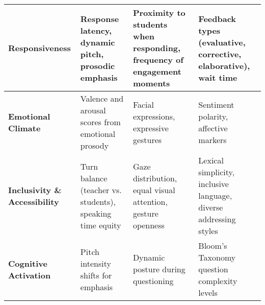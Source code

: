 \begin{table*}[htbp]
\begin{tabularx}{\textwidth}{|>{\raggedright\arraybackslash}X|>{\raggedright\arraybackslash}X|>{\raggedright\arraybackslash}X|>{\raggedright\arraybackslash}X|}
	\textbf{Responsiveness} & 
Response latency, dynamic pitch, prosodic emphasis \cite{rowe1986wait, dmello2012multimodal} & 
Proximity to students when responding, frequency of engagement moments \cite{mcneill1992hand, ochoa2016multimodal} & 
Feedback types (evaluative, corrective, elaborative), wait time \cite{rowe1986wait} \\
\hline

	\textbf{Emotional Climate} & 
Valence and arousal scores from emotional prosody \cite{dmello2012multimodal} & 
Facial expressions, expressive gestures \cite{mcneill1992hand, ochoa2016multimodal} & 
Sentiment polarity, affective markers \cite{dmello2012multimodal} \\
\hline

	\textbf{Inclusivity \& Accessibility} & 
Turn balance (teacher vs. students), speaking time equity & 
Gaze distribution, equal visual attention, gesture openness \cite{fugate2010gaze} & 
Lexical simplicity, inclusive language, diverse addressing styles \cite{Steinberg2021, Heffernan2022} \\
\hline

	\textbf{Cognitive Activation} & 
Pitch intensity shifts for emphasis & 
Dynamic posture during questioning & 
Bloom's Taxonomy question complexity levels \cite{graesser2005question, chi1989self} \\
\hline

\end{tabularx}
\end{table*}
